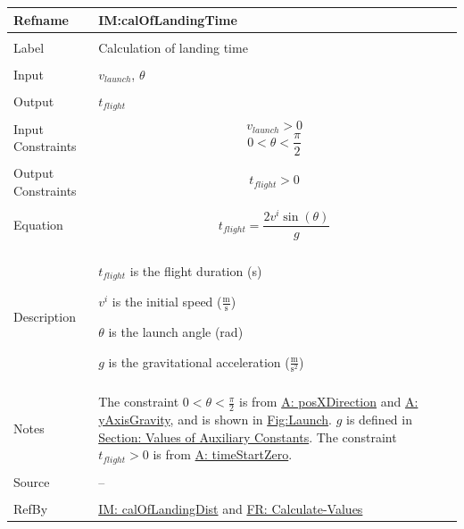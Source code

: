 \documentclass[12pt]{article}
\begin{document}
\noindent \begin{minipage}{\textwidth}
\begin{tabular}{p{} p{}}
\toprule \textbf{Refname} & \textbf{IM:calOfLandingTime}
\label{IM:calOfLandingTime}
\\ \midrule \\
Label & Calculation of landing time
\\ \midrule \\
Input & ${v_{launch}}$, $θ$
\\ \midrule \\
Output & ${t_{flight}}$
\\ \midrule \\
Input Constraints & \begin{displaymath}
                    {v_{launch}}>0
                    \end{displaymath}
                    \begin{displaymath}
                    0<θ<\frac{π}{2}
                    \end{displaymath}
\\ \midrule \\
Output Constraints & \begin{displaymath}
                     {t_{flight}}>0
                     \end{displaymath}
\\ \midrule \\
Equation & \begin{displaymath}
           {t_{flight}}=\frac{2 {v^{i}} \sin\left(θ\right)}{g}
           \end{displaymath}
\\ \midrule \\
Description & \begin{symbDescription}
              \item{${t_{flight}}$ is the flight duration (s)}
              \item{${v^{i}}$ is the initial speed ($\frac{\text{m}}{\text{s}}$)}
              \item{$θ$ is the launch angle (rad)}
              \item{$g$ is the gravitational acceleration ($\frac{\text{m}}{\text{s}^{2}}$)}
              \end{symbDescription}
\\ \midrule \\
Notes & The constraint $0<θ<\frac{π}{2}$ is from \hyperref[posXDirection]{A: posXDirection} and \hyperref[yAxisGravity]{A: yAxisGravity}, and is shown in \hyperref[Figure:Launch]{Fig:Launch}.
        $g$ is defined in \hyperref[Sec:AuxConstants]{Section: Values of Auxiliary Constants}.
        The constraint ${t_{flight}}>0$ is from \hyperref[timeStartZero]{A: timeStartZero}.
\\ \midrule \\
Source & --
\\ \midrule \\
RefBy & \hyperref[IM:calOfLandingDist]{IM: calOfLandingDist} and \hyperref[calcValues]{FR: Calculate-Values}
\\ \bottomrule \end{tabular}
\end{minipage}
\end{document}
